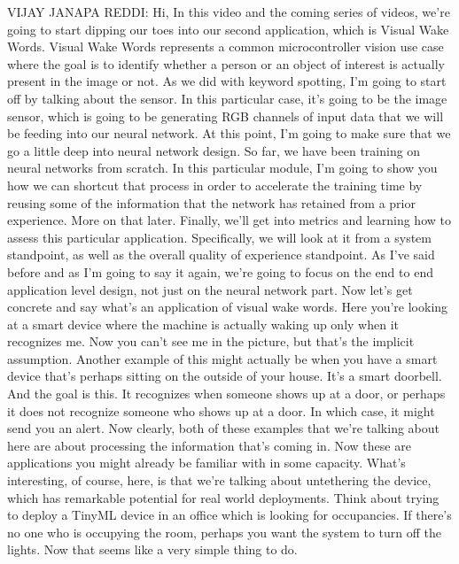   VIJAY JANAPA REDDI: Hi, In this video and the coming series of videos,
  we're going to start dipping our toes into our second application, which
  is Visual Wake Words.
  Visual Wake Words represents a common microcontroller vision use case
  where the goal is to identify whether a person or an object of interest
  is actually present in the image or not.
  As we did with keyword spotting, I'm going to start off
  by talking about the sensor.
  In this particular case, it's going to be the image sensor, which
  is going to be generating RGB channels of input data
  that we will be feeding into our neural network.
  At this point, I'm going to make sure that we
  go a little deep into neural network design.
  So far, we have been training on neural networks from scratch.
  In this particular module, I'm going to show you
  how we can shortcut that process in order to accelerate the training
  time by reusing some of the information that the network has
  retained from a prior experience.
  More on that later.
  Finally, we'll get into metrics and learning
  how to assess this particular application.
  Specifically, we will look at it from a system standpoint,
  as well as the overall quality of experience standpoint.
  As I've said before and as I'm going to say it again,
  we're going to focus on the end to end application level design,
  not just on the neural network part.
  Now let's get concrete and say what's an application of visual wake words.
  Here you're looking at a smart device where the machine is actually
  waking up only when it recognizes me.
  Now you can't see me in the picture, but that's the implicit assumption.
  Another example of this might actually be
  when you have a smart device that's perhaps
  sitting on the outside of your house.
  It's a smart doorbell.
  And the goal is this.
  It recognizes when someone shows up at a door,
  or perhaps it does not recognize someone who shows up at a door.
  In which case, it might send you an alert.
  Now clearly, both of these examples that we're talking about here
  are about processing the information that's coming in.
  Now these are applications you might already
  be familiar with in some capacity.
  What's interesting, of course, here, is that we're
  talking about untethering the device, which
  has remarkable potential for real world deployments.
  Think about trying to deploy a TinyML device in an office which
  is looking for occupancies.
  If there's no one who is occupying the room,
  perhaps you want the system to turn off the lights.
  Now that seems like a very simple thing to do.
